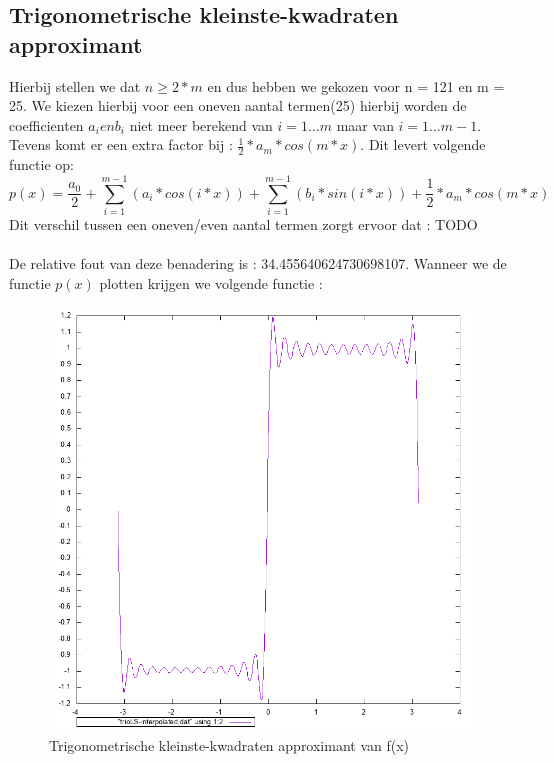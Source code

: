 \documentclass[10pt,a4paper]{article}
\begin{document}
\subsection{Trigonometrische kleinste-kwadraten approximant}
Hierbij stellen we dat $n \geq 2*m$ en dus hebben we gekozen voor n = 121 en m = 25. We kiezen hierbij voor een oneven aantal termen(25) hierbij worden de coefficienten $a_{i} en b_{i}$ niet meer berekend van $i = 1 \hdots m$ maar van $i = 1 \hdots m-1$. Tevens komt er een extra factor bij : $\frac{1}{2}*a_{m}*cos(m * x)$. Dit levert volgende functie op:
$$
p(x) = \frac{a_{0}}{2} + \sum_{i = 1}^{m-1}(a_{i} * cos(i * x)) + \sum_{i = 1}^{m-1}(b_{i} * sin(i * x)) + \frac{1}{2}*a_{m}*cos(m * x)
$$
Dit verschil tussen een oneven/even aantal termen zorgt ervoor dat : TODO
\\
\\
De relative fout van deze benadering is : 34.455640624730698107. Wanneer we de functie $p(x)$ plotten krijgen we volgende functie : 
\begin{figure}[H]
\centering
\includegraphics[scale=0.3]{../Twographs/trioLS-interpolated}
\caption{Trigonometrische kleinste-kwadraten approximant van f(x)}
\end{figure}
\begin{figure}[H]
\end{figure}
\end{document}
